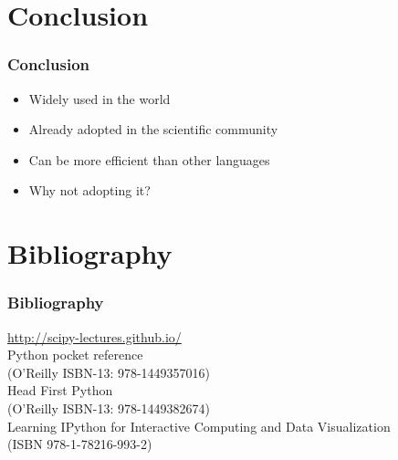 \documentclass[14pt]{beamer}
\begin{document}
\section{Conclusion}
\begin{frame}
\frametitle{Conclusion}
\begin{itemize}
\item Widely used in the world
\item Already adopted in the scientific community
\item Can be more efficient than other languages
\item \alert{Why not adopting it?}
\end{itemize}
\end{frame}

\appendix
\section{Bibliography}

\begin{frame}
\frametitle{Bibliography}
\url{http://scipy-lectures.github.io/}\\
Python pocket reference\\ (O'Reilly ISBN-13: 978-1449357016)\\
Head First Python\\ (O'Reilly ISBN-13: 978-1449382674)\\
Learning IPython for Interactive Computing and Data Visualization \\(ISBN 978-1-78216-993-2)
\end{frame}
\end{document}
